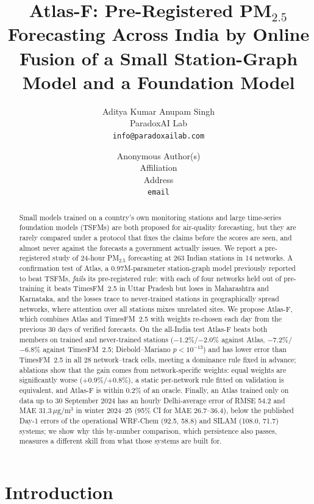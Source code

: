 \documentclass{article}
\title{Atlas-F: Pre-Registered PM$_{2.5}$ Forecasting Across India by Online Fusion of a Small Station-Graph Model and a Foundation Model}
\author{%
  Aditya Kumar \qquad Anupam Singh\\
  ParadoxAI Lab\\
  \texttt{info@paradoxailab.com}
}
\author{Anonymous Author(s)\\Affiliation\\Address\\\texttt{email}}
\newcommand{\pmu}{\ensuremath{\mu\mathrm{g/m^3}}}
\newcommand{\pmtf}{PM$_{2.5}$}
\newcommand{\IoneMAEci}{26.7--36.4}\newcommand{\IoneRMSEci}{42.6--66.5}
\begin{document}
\maketitle

\begin{abstract}
Small models trained on a country's own monitoring stations and large time-series foundation models (TSFMs) are both
proposed for air-quality forecasting, but they are rarely compared under a protocol that fixes the claims before the
scores are seen, and almost never against the forecasts a government actually issues. We report a pre-registered study
of 24-hour \pmtf{} forecasting at 263 Indian stations in 14 networks. A confirmation test of Atlas, a 0.97M-parameter
station-graph model previously reported to beat TSFMs, \emph{fails} its pre-registered rule: with each of four networks
held out of pre-training it beats TimesFM~2.5 in Uttar Pradesh but loses in Maharashtra and Karnataka, and the losses
trace to never-trained stations in geographically spread networks, where attention over all stations mixes unrelated
sites. We propose Atlas-F, which combines Atlas and TimesFM~2.5 with weights re-chosen each day from the previous 30 days
of verified forecasts. On the all-India test Atlas-F beats both members on trained and never-trained stations
($-1.2\%$/$-2.0\%$ against Atlas, $-7.2\%$/$-6.8\%$ against TimesFM~2.5; Diebold--Mariano $p<10^{-13}$) and has lower
error than TimesFM~2.5 in all 28 network--track cells, meeting a dominance rule fixed in advance; ablations show
that the gain comes from network-specific weights: equal weights are significantly worse ($+0.9\%$/$+0.8\%$), a static per-network rule fitted on validation is equivalent, and Atlas-F is within 0.2\% of an oracle. Finally, an Atlas trained only on data up to 30 September 2024 has an hourly Delhi-average error of
RMSE 54.2 and MAE 31.3\,\pmu{} in winter 2024--25 (95\% CI for MAE \IoneMAEci), below the published Day-1 errors of the
operational WRF-Chem (92.5, 58.8) and SILAM (108.0, 71.7) systems; we show why this by-number comparison, which
persistence also passes, measures a different skill from what those systems are built for.
\end{abstract}

\section{Introduction}
\label{sec:intro}
\end{document}
